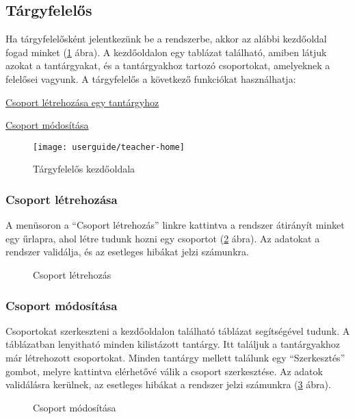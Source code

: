 \subsection{Tárgyfelelős}\label{step:teacher-role}
Ha tárgyfelelősként jelentkezünk be a rendszerbe, akkor az alábbi kezdőoldal fogad minket (\ref{fig:teacher-home} ábra).
A kezdőoldalon egy tablázat található, amiben látjuk azokat a tantárgyakat, és a tantárgyakhoz tartozó csoportokat, amelyeknek a felelősei vagyunk.
A tárgyfelelős a következő funkciókat használhatja:
\begin{compactitem}
    \item \hyperref[step:teacher-create-course]{Csoport létrehozása egy tantárgyhoz}
    \item \hyperref[step:teacher-edit-course]{Csoport módosítása}
\end{compactitem}
\begin{figure}[H]
	\centering
	\texttt{[image: userguide/teacher-home]}
	\caption{Tárgyfelelős kezdőoldala}
	\label{fig:teacher-home}
\end{figure}
\subsubsection{Csoport létrehozása}
\label{step:teacher-create-course}
A menüsoron a ``Csoport létrehozás'' linkre kattintva a rendszer átirányít minket egy űrlapra, ahol létre tudunk hozni egy csoportot (\ref{fig:teacher-create-course} ábra). Az adatokat a rendszer validálja, és az esetleges hibákat jelzi számunkra.
\begin{figure}[H]
	\centering
	\hspace{5pt}
	\caption{Csoport létrehozás}
	\label{fig:teacher-create-course}
\end{figure}
\subsubsection{Csoport módosítása}
\label{step:teacher-edit-course}
Csoportokat szerkeszteni a kezdőoldalon található táblázat segítségével tudunk. A táblázatban lenyitható minden kilistázott tantárgy. Itt találjuk a tantárgyakhoz már létrehozott csoportokat. Minden tantárgy mellett találunk egy ``Szerkesztés'' gombot, melyre kattintva elérhetővé válik a csoport szerkesztése. Az adatok validálásra kerülnek, az esetleges hibákat a rendszer jelzi számunkra (\ref{fig:teacher-edit-course} ábra).
\begin{figure}[H]
	\centering
	\hspace{5pt}
	\caption{Csoport módosítása}
	\label{fig:teacher-edit-course}
\end{figure}
